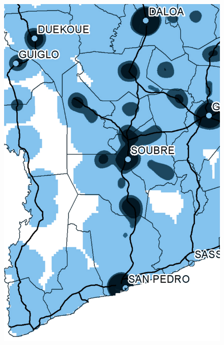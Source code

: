 \begin{figure}[h!]
{    \includegraphics[scale = 0.1]{results/images/kernel/l_hour19_kd_detail.pdf}
	\label{fig:subfig2_detail}
}
\subfigure[Wednesday, 10:00]{
}
\end{figure}
